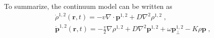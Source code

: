 \documentclass[10pt,aspectratio=43,mathserif,table]{beamer}
\begin{document}
\begin{frame}
    To summarize, the continuum model can be written as
    \begin{subequations}
        \begin{align}
            &\dot{\rho}^{1,2}\left( \mathbf{r},t \right) =-v\nabla \cdot \boldsymbol{p}^{1,2}+D\nabla ^2\rho ^{1,2}\;,\\
            &\dot{\boldsymbol{p}}^{1,2}\left( \mathbf{r},t \right) =-\frac{v}{2}\nabla \rho ^{1,2}+D\nabla ^2\boldsymbol{p}^{1,2}+\omega \boldsymbol{p}_{\bot}^{1,2}-K\rho\boldsymbol{p}\;,
        \end{align}
    \end{subequations}
\end{frame}



\end{document}
